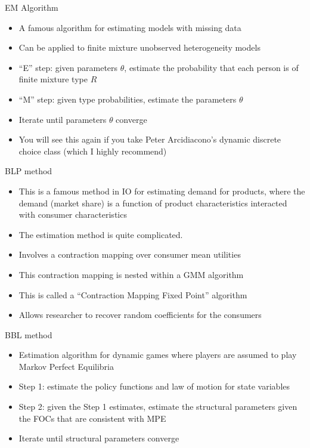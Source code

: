\documentclass[english,xcolor=dvipsnames]{beamer}
\begin{document}
\begin{frame}{EM Algorithm}
\begin{itemize}
	\item A famous algorithm for estimating models with missing data
	\item Can be applied to finite mixture unobserved heterogeneity models
	\item ``E'' step: given parameters $\theta$, estimate the probability that each person is of finite mixture type $R$
	\item ``M'' step: given type probabilities, estimate the parameters $\theta$
	\item Iterate until parameters $\theta$ converge
	\item You will see this again if you take Peter Arcidiacono's dynamic discrete choice class (which I highly recommend)
\end{itemize}
\end{frame}

\begin{frame}{BLP method}
\begin{itemize}
	\item This is a famous method in IO for estimating demand for products, where the demand (market share) is a function of product characteristics interacted with consumer characteristics
	\item The estimation method is quite complicated.
	\item Involves a contraction mapping over consumer mean utilities
	\item This contraction mapping is nested within a GMM algorithm
	\item This is called a ``Contraction Mapping Fixed Point'' algorithm
	\item Allows researcher to recover random coefficients for the consumers
\end{itemize}
\end{frame}

\begin{frame}{BBL method}
\begin{itemize}
	\item Estimation algorithm for dynamic games where players are assumed to play Markov Perfect Equilibria
	\item Step 1: estimate the policy functions and law of motion for state variables
	\item Step 2: given the Step 1 estimates, estimate the structural parameters given the FOCs that are consistent with MPE
	\item Iterate until structural parameters converge
\end{itemize}
\end{frame}
\end{document}
